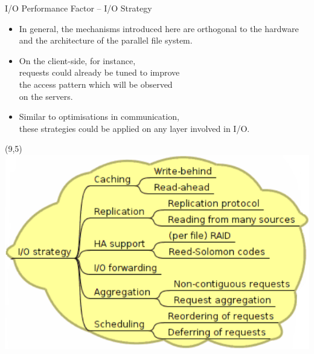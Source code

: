 \documentclass[compress,11pt,xcolor=svgnames,aspectratio=169]{beamer}
\begin{document}
\begin{frame}[fragile]{I/O Performance Factor -- I/O Strategy}

\begin{itemize}
\setlength\itemsep{0.5cm}

  \item In general, the mechanisms introduced here are orthogonal to the hardware and the architecture of the parallel file system.

  \item On the client-side, for instance, \\
  requests could already be tuned to improve \\
  the access pattern which will be observed \\
  on the servers.

  \item Similar to optimisations in communication, \\
  these strategies could be applied on any layer involved in I/O.

\end{itemize}

\begin{textblock}{0}(9,5)
   \includegraphics[scale=0.4]{fig/tree-io-strat}
\end{textblock}


\nocite{SOPPOAASLK13}

\end{frame}
\end{document}
